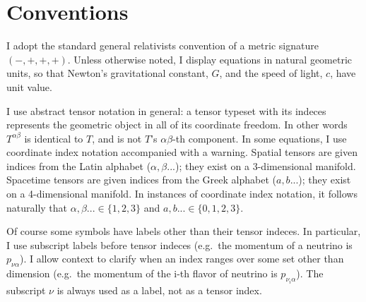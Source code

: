 
\section{Conventions}
\label{sec:conventions}

I adopt the standard general relativists convention of a metric signature
$(-,+,+,+)$.
Unless otherwise noted, I display equations in natural geometric units, so that
Newton's gravitational constant, $G$, and the speed of light, $c$, have unit
value.

I use abstract tensor notation in general: a tensor typeset with its indeces
represents the geometric object in all of its coordinate freedom. In other words
$T^{\alpha \beta}$ is identical to $T$, and is not $T$'s $\alpha\beta$-th
component.
In some equations, I use coordinate index notation accompanied with a warning.
Spatial tensors are given indices from the Latin alphabet ($\alpha,\beta...$);
they exist on a 3-dimensional manifold. Spacetime tensors are given indices from
the Greek alphabet ($a,b...$); they exist on a 4-dimensional manifold.
In instances of coordinate index notation, it follows naturally that
$\alpha,\beta...\in\{1,2,3\}$ and $a,b...\in\{0,1,2,3\}$.

Of course some symbols have labels other than their tensor indeces.
In particular, I use subscript labels before tensor indeces (e.g.\ the
momentum of a neutrino is $p_{\nu \alpha}$). I allow context to clarify when
an index ranges over some set other than dimension (e.g.\ the momentum of the
i-th flavor of neutrino is $p_{\nu_i \alpha}$). The subscript $\nu$ is always
used as a label, not as a tensor index.

